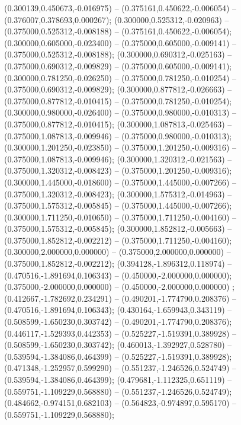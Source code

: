  (0.300139,0.450673,-0.016975) -- (0.375161,0.450622,-0.006054) -- (0.376007,0.378693,0.000267);
 (0.300000,0.525312,-0.020963) -- (0.375000,0.525312,-0.008188) -- (0.375161,0.450622,-0.006054);
 (0.300000,0.605000,-0.023400) -- (0.375000,0.605000,-0.009141) -- (0.375000,0.525312,-0.008188);
 (0.300000,0.690312,-0.025163) -- (0.375000,0.690312,-0.009829) -- (0.375000,0.605000,-0.009141);
 (0.300000,0.781250,-0.026250) -- (0.375000,0.781250,-0.010254) -- (0.375000,0.690312,-0.009829);
 (0.300000,0.877812,-0.026663) -- (0.375000,0.877812,-0.010415) -- (0.375000,0.781250,-0.010254);
 (0.300000,0.980000,-0.026400) -- (0.375000,0.980000,-0.010313) -- (0.375000,0.877812,-0.010415);
 (0.300000,1.087813,-0.025463) -- (0.375000,1.087813,-0.009946) -- (0.375000,0.980000,-0.010313);
 (0.300000,1.201250,-0.023850) -- (0.375000,1.201250,-0.009316) -- (0.375000,1.087813,-0.009946);
 (0.300000,1.320312,-0.021563) -- (0.375000,1.320312,-0.008423) -- (0.375000,1.201250,-0.009316);
 (0.300000,1.445000,-0.018600) -- (0.375000,1.445000,-0.007266) -- (0.375000,1.320312,-0.008423);
 (0.300000,1.575312,-0.014963) -- (0.375000,1.575312,-0.005845) -- (0.375000,1.445000,-0.007266);
 (0.300000,1.711250,-0.010650) -- (0.375000,1.711250,-0.004160) -- (0.375000,1.575312,-0.005845);
 (0.300000,1.852812,-0.005663) -- (0.375000,1.852812,-0.002212) -- (0.375000,1.711250,-0.004160);
 (0.300000,2.000000,0.000000) -- (0.375000,2.000000,0.000000) -- (0.375000,1.852812,-0.002212);
 (0.394128,-1.896312,0.118974) -- (0.470516,-1.891694,0.106343) -- (0.450000,-2.000000,0.000000);
 (0.375000,-2.000000,0.000000) -- (0.450000,-2.000000,0.000000) ;
 (0.412667,-1.782692,0.234291) -- (0.490201,-1.774790,0.208376) -- (0.470516,-1.891694,0.106343);
 (0.430164,-1.659943,0.343119) -- (0.508599,-1.650230,0.303742) -- (0.490201,-1.774790,0.208376);
 (0.446117,-1.529393,0.442353) -- (0.525227,-1.519391,0.389928) -- (0.508599,-1.650230,0.303742);
 (0.460013,-1.392927,0.528780) -- (0.539594,-1.384086,0.464399) -- (0.525227,-1.519391,0.389928);
 (0.471348,-1.252957,0.599290) -- (0.551237,-1.246526,0.524749) -- (0.539594,-1.384086,0.464399);
 (0.479681,-1.112325,0.651119) -- (0.559751,-1.109229,0.568880) -- (0.551237,-1.246526,0.524749);
 (0.484662,-0.974151,0.682103) -- (0.564823,-0.974897,0.595170) -- (0.559751,-1.109229,0.568880);
